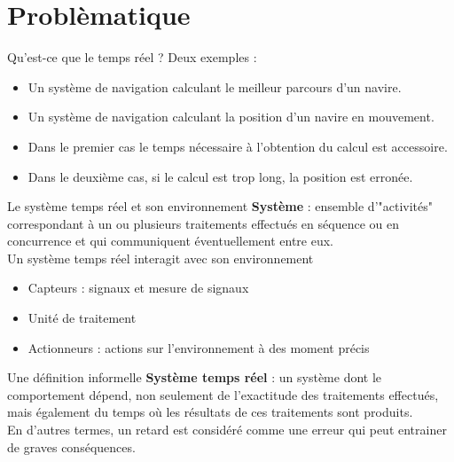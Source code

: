 %                                                                                       
%
%

\part{Problèmatique}

\begin{frame}{Qu'est-ce que le temps réel ?}
  Deux exemples :
  \begin{itemize} 
  \item Un  système de navigation calculant le  meilleur parcours d'un
    navire.
  \item Un système de navigation  calculant la position d'un navire en
    mouvement.
  \end{itemize}     
  \begin{itemize}
  \item  Dans le  premier cas  le  temps nécessaire  à l'obtention  du
    calcul est accessoire.
  \item Dans le deuxième cas, si  le calcul est trop long, la position
    est erronée.
  \end{itemize}
\end{frame}

\begin{frame}{Le système temps réel et son environnement}
  \textbf{Système}  :  ensemble d'"activités"  correspondant  à un  ou
  plusieurs traitements effectués en séquence ou en concurrence et qui
  communiquent  éventuellement entre eux.\\[3mm]

  Un système temps réel interagit avec son environnement
  \begin{itemize}
  \item Capteurs : signaux et mesure de signaux
  \item Unité de traitement
  \item Actionneurs : actions sur l'environnement à des moment précis
  \end{itemize}
\end{frame}

\begin{frame}{Une définition informelle}
  \textbf{Système  temps réel  }  : un  système  dont le  comportement
  dépend,  non seulement  de l'exactitude  des  traitements effectués,
  mais également
  du temps où les résultats de ces traitements sont produits.\\[3mm]

  En d'autres  termes, un  retard est considéré  comme une  erreur qui
  peut entrainer de graves  conséquences.  

\end{frame}

